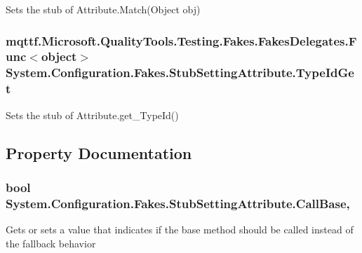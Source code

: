 Sets the stub of Attribute.\-Match(\-Object obj)

\hypertarget{class_system_1_1_configuration_1_1_fakes_1_1_stub_setting_attribute_ab27090eed2fc438601279e3494b485b7}{
\subsubsection[{Type\-Id\-Get}]{\setlength{\rightskip}{0pt plus 5cm}mqttf.\-Microsoft.\-Quality\-Tools.\-Testing.\-Fakes.\-Fakes\-Delegates.\-Func$<$object$>$ System.\-Configuration.\-Fakes.\-Stub\-Setting\-Attribute.\-Type\-Id\-Get}}\label{class_system_1_1_configuration_1_1_fakes_1_1_stub_setting_attribute_ab27090eed2fc438601279e3494b485b7}


Sets the stub of Attribute.\-get\-\_\-\-Type\-Id()



\subsection{Property Documentation}
\hypertarget{class_system_1_1_configuration_1_1_fakes_1_1_stub_setting_attribute_aab5839304448177ba91273223729c0a6}{
\subsubsection[{Call\-Base}]{\setlength{\rightskip}{0pt plus 5cm}bool System.\-Configuration.\-Fakes.\-Stub\-Setting\-Attribute.\-Call\-Base\hspace{0.3cm}{\ttfamily [get]}, {\ttfamily [set]}}}\label{class_system_1_1_configuration_1_1_fakes_1_1_stub_setting_attribute_aab5839304448177ba91273223729c0a6}


Gets or sets a value that indicates if the base method should be called instead of the fallback behavior

